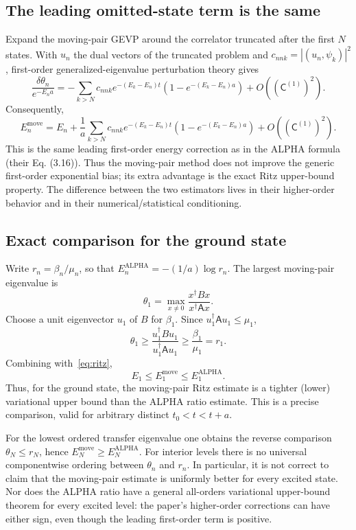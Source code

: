 \documentclass[11pt]{article}
\newcommand{\C}{\mathsf C}
\newcommand{\A}{\mathsf A}
\newcommand{\Ealp}{E^{\mathrm{ALPHA}}}
\newcommand{\Emov}{E^{\mathrm{move}}}
\begin{document}
\subsection{The leading omitted-state term is the same}
Expand the moving-pair GEVP around the correlator truncated after the first $N$ states. With $u_n$ the dual vectors of the truncated problem and $c_{nnk}=|(u_n,\psi_k)|^2$, first-order generalized-eigenvalue perturbation theory gives
\[
\frac{\delta\theta_n}{e^{-E_na}}
=-\sum_{k>N}c_{nnk}e^{-(E_k-E_n)t}\left(1-e^{-(E_k-E_n)a}\right)+O((\C^{(1)})^2).
\]
Consequently,
\[
\Emov_n=E_n+\frac1a\sum_{k>N}c_{nnk}e^{-(E_k-E_n)t}\left(1-e^{-(E_k-E_n)a}\right)+O((\C^{(1)})^2).
\]
This is the same leading first-order energy correction as in the ALPHA formula (their Eq. (3.16)). Thus the moving-pair method does not improve the generic first-order exponential bias; its extra advantage is the exact Ritz upper-bound property. The difference between the two estimators lives in their higher-order behavior and in their numerical/statistical conditioning.

\subsection{Exact comparison for the ground state}
Write $r_n=\beta_n/\mu_n$, so that $\Ealp_n=-(1/a)\log r_n$. The largest moving-pair eigenvalue is
\[
\theta_1=\max_{x\ne0}\frac{x^\dagger Bx}{x^\dagger\A x}.
\]
Choose a unit eigenvector $u_1$ of $B$ for $\beta_1$. Since $u_1^\dagger\A u_1\leq\mu_1$,
\[
\theta_1\geq\frac{u_1^\dagger Bu_1}{u_1^\dagger\A u_1}
\geq\frac{\beta_1}{\mu_1}=r_1.
\]
Combining with~\eqref{eq:ritz},
\begin{equation}
\boxed{E_1\leq\Emov_1\leq\Ealp_1.}
\label{eq:groundorder}
\end{equation}
Thus, for the ground state, the moving-pair Ritz estimate is a tighter (lower) variational upper bound than the ALPHA ratio estimate. This is a precise comparison, valid for arbitrary distinct $t_0<t<t+a$.

For the lowest ordered transfer eigenvalue one obtains the reverse comparison $\theta_N\leq r_N$, hence $\Emov_N\geq\Ealp_N$. For interior levels there is no universal componentwise ordering between $\theta_n$ and $r_n$. In particular, it is not correct to claim that the moving-pair estimate is uniformly better for every excited state. Nor does the ALPHA ratio have a general all-orders variational upper-bound theorem for every excited level: the paper's higher-order corrections can have either sign, even though the leading first-order term is positive.
\end{document}
